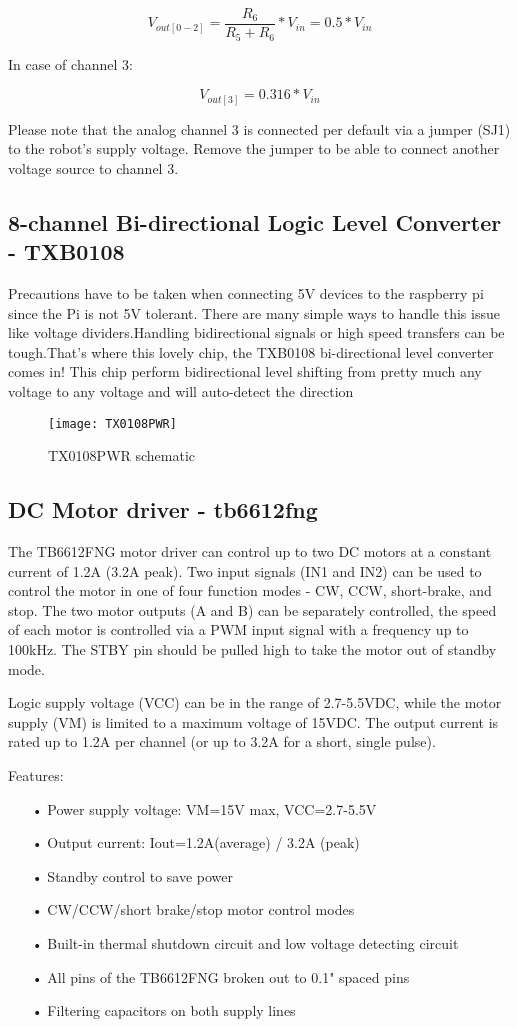 \documentclass[
12pt, %
a4paper, %
oneside, %
headinclude,footinclude, %
BCOR5mm, %
]{scrartcl}
\begin{document}
\[ V_{ out[0-2] } = \frac{ R_{6} }{ R_{5} + R_{6} } * V_{in}  = 0.5* V_{in}\]

In case of channel 3:

\[ V_{out[3]} = 0.316 * V_{in}\]

Please note that the analog channel 3 is connected per default via a jumper (SJ1) to the robot's supply voltage. Remove the jumper to be able to connect another voltage source to channel 3. 

\subsection{8-channel Bi-directional Logic Level Converter - TXB0108}
Precautions have to be taken when connecting 5V devices to the raspberry pi since the Pi is not 5V tolerant. There are many simple ways to handle this issue like voltage dividers.Handling bidirectional signals or high speed transfers can be tough.That's where this lovely chip, the TXB0108 bi-directional level converter comes in! This chip perform bidirectional level shifting from pretty much any voltage to any voltage and will auto-detect the direction 

\begin{figure}[!htb]
\centering
\texttt{[image: TX0108PWR]} 
\caption[TX0108PWR schematic]{TX0108PWR schematic}
\label{fig:TX0108PWR}
\end{figure}

\subsection {DC Motor driver - tb6612fng}
The TB6612FNG motor driver can control up to two DC motors at a constant current of 1.2A (3.2A peak). Two input signals (IN1 and IN2) can be used to control the motor in one of four function modes - CW, CCW, short-brake, and stop. The two motor outputs (A and B) can be separately controlled, the speed of each motor is controlled via a PWM input signal with a frequency up to 100kHz. The STBY pin should be pulled high to take the motor out of standby mode.

Logic supply voltage (VCC) can be in the range of 2.7-5.5VDC, while the motor supply (VM) is limited to a maximum voltage of 15VDC. The output current is rated up to 1.2A per channel (or up to 3.2A for a short, single pulse).

Features:
\begin{itemize}
\item[•] Power supply voltage: VM=15V max, VCC=2.7-5.5V
\item[•] Output current: Iout=1.2A(average) / 3.2A (peak)
\item[•] Standby control to save power
\item[•] CW/CCW/short brake/stop motor control modes
\item[•] Built-in thermal shutdown circuit and low voltage detecting circuit
\item[•] All pins of the TB6612FNG broken out to 0.1" spaced pins
\item[•] Filtering capacitors on both supply lines
\end{itemize}
\end{document}
